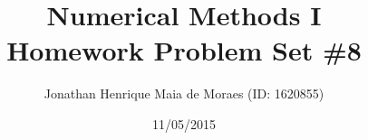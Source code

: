 \title{Numerical Methods I \\ Homework Problem Set \#8}
\author{Jonathan Henrique Maia de Moraes (ID: 1620855)}
\date{11/05/2015}
\maketitle
